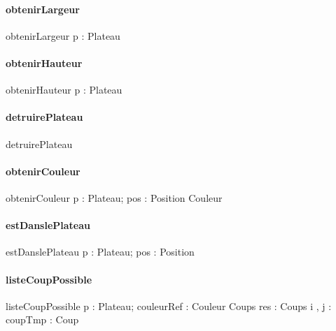 \paragraph{obtenirLargeur}
\begin{algorithme}
\fonction
{obtenirLargeur}
{p : Plateau}
{\naturel}
{
}
{
}
\end{algorithme}

\paragraph{obtenirHauteur}
\begin{algorithme}
\fonction
{obtenirHauteur}
{p : Plateau}
{\naturel}
{
}
{
}
\end{algorithme}


\paragraph{detruirePlateau}
\begin{algorithme}
\procedure
{detruirePlateau}
{}
{}
{
} 

\end{algorithme}


\paragraph{obtenirCouleur}
\begin{algorithme}
\fonction
{obtenirCouleur}
{p : Plateau; pos : Position}
{Couleur}
{
}
{
}
\end{algorithme}

\paragraph{estDanslePlateau}
\begin{algorithme}
\fonction
{estDanslePlateau}
{p : Plateau; pos : Position}
{\naturel}
{
}
{
}
\end{algorithme}

\paragraph{listeCoupPossible}
\begin{algorithme}
\fonction
{listeCoupPossible}
{p : Plateau; couleurRef : Couleur}
{Coups}
{res : Coups \newline
 i , j : \naturel \newline
 coupTmp : Coup
}
{
	{
		{
			{
			} 
		}
	}
	
}
\end{algorithme}


